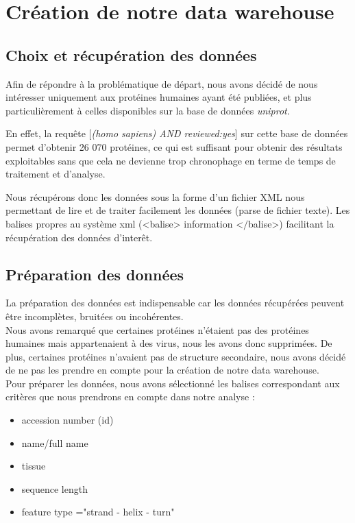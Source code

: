 \section*{Création de notre data warehouse}

\subsection*{Choix et récupération des données}


Afin de répondre à la problématique de départ, nous avons décidé de nous intéresser uniquement aux protéines humaines ayant été publiées, et plus particulièrement à celles disponibles sur la base de données \emph{uniprot}.

En effet, la requête [\emph{(homo sapiens) AND reviewed:yes}] sur cette base de données permet d'obtenir 26 070 protéines, ce qui est suffisant pour obtenir des résultats exploitables sans que cela ne devienne trop chronophage en terme de temps de traitement et d'analyse.

Nous récupérons donc les données sous la forme d'un fichier XML nous permettant de lire et de traiter facilement les données (parse de fichier texte). Les balises propres au système xml (<balise> information <$/$balise>) facilitant la récupération des données d'inter\^et.

\subsection*{Préparation des données}

La préparation des données est indispensable car les données récupérées peuvent être incomplètes, bruitées ou incohérentes.\\
Nous avons remarqué que certaines protéines n'étaient pas des protéines humaines mais appartenaient à des virus, nous les avons donc supprimées. De plus, certaines protéines n'avaient pas de structure secondaire, nous avons décidé de ne pas les prendre en compte pour la création de notre data warehouse.\\
Pour préparer les données, nous avons sélectionné les balises correspondant aux critères que nous prendrons en compte dans notre analyse :
\renewcommand\labelitemi{\textbullet}
\begin{itemize}
\item accession number (id)
\item name/full name
\item tissue
\item sequence length
\item feature type ="strand  - helix - turn"\\
\end{itemize}

